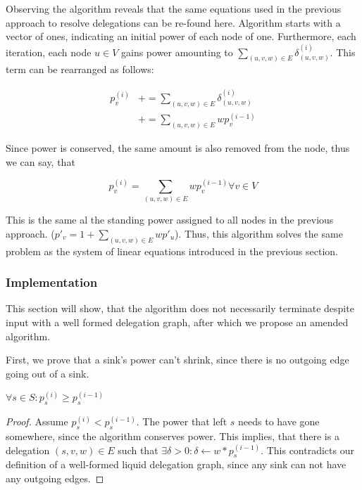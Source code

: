 Observing the algorithm reveals that the same equations used in the previous approach to resolve delegations can be re-found here. Algorithm starts with a vector of ones, indicating an initial power of each node of one. Furthermore, each iteration, each node $u \in V$ gains power amounting to $\sum_{(u, v, w) \in E} \delta^{(i)}_{(u, v, w)}$. This term can be rearranged as follows:

\begin{align*}
p_v^{(i)} &+= \sum_{(u, v, w) \in E} \delta^{(i)}_{(u, v, w)} \\
&+= \sum_{(u, v, w) \in E} wp_v^{(i-1)}
\end{align*}

Since power is conserved, the same amount is also removed from the node, thus we can say, that

\[
p_v^{(i)} = \sum_{(u, v, w) \in E} wp_v^{(i-1)} \forall v \in V
\]


This is the same al the standing power assigned to all nodes in the previous approach. ($p'_v = 1 + \sum_{(u, v, w) \in E} wp'_u$). Thus, this algorithm solves the same problem as the system of linear equations introduced in the previous section. 


\subsubsection{Implementation}

This section will show, that the algorithm does not necessarily terminate despite input with a well formed delegation graph, after which we propose an amended algorithm.

First, we prove that a sink's power can't shrink, since there is no outgoing edge going out of a sink.

\begin{lemma}\label{lem:sink_non_shrink}
$\forall s \in S: p_s^{(i)} \ge p_s^{(i-1)}$ 
\end{lemma}
\begin{proof}
Assume $p_s^{(i)} < p_s^{(i-1)}$. The power that left $s$ needs to have gone somewhere, since the algorithm conserves power. This implies, that there is a delegation $(s, v, w) \in E$ such that $\exists \delta > 0: \delta \gets w * p_s^{(i-1)}$. This contradicts our definition of a well-formed liquid delegation graph, since any sink can not have any outgoing edges.
\end{proof}

